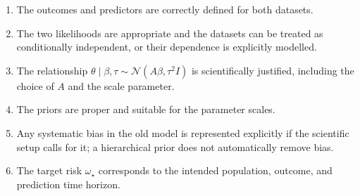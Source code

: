 \documentclass[11pt,a4paper]{article}
\begin{document}
\begin{enumerate}[label=\arabic*.]
  \item The outcomes and predictors are correctly defined for both datasets.
  \item The two likelihoods are appropriate and the datasets can be treated as conditionally independent, or their dependence is explicitly modelled.
  \item The relationship $\theta\mid\beta,\tau\sim\mathcal N(A\beta,\tau^2I)$ is scientifically justified, including the choice of $A$ and the scale parameter.
  \item The priors are proper and suitable for the parameter scales.
  \item Any systematic bias in the old model is represented explicitly if the scientific setup calls for it; a hierarchical prior does not automatically remove bias.
  \item The target risk $\omega_\star$ corresponds to the intended population, outcome, and prediction time horizon.
\end{enumerate}
\end{document}
